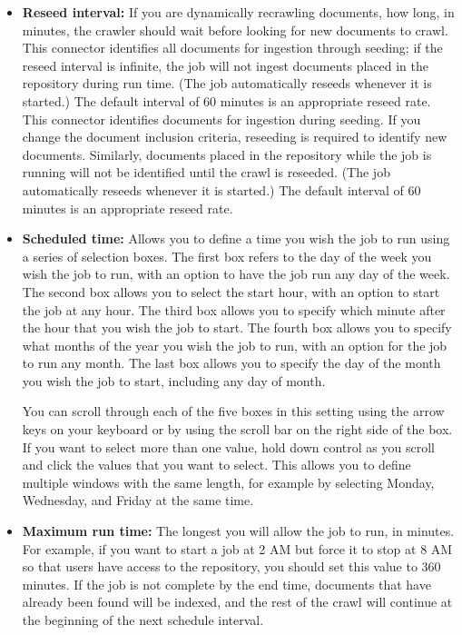 \begin{itemize}
\item \textbf{Reseed interval:} If you are dynamically recrawling
documents, how long, in minutes, the crawler should wait before
looking for new documents to crawl. \ifMeridioGuide This connector
identifies all documents for ingestion through seeding; if the reseed
interval is infinite, the job will not ingest documents placed in the
repository during run time. (The job automatically reseeds whenever it
is started.) The default interval of 60 minutes is an appropriate
reseed rate. \fi \ifFilenetGuide This connector identifies documents
for ingestion during seeding. If you change the document inclusion
criteria, reseeding is required to identify new documents. Similarly,
documents placed in the repository while the job is running will not
be identified until the crawl is reseeded.  (The job automatically
reseeds whenever it is started.) The default interval of 60 minutes is
an appropriate reseed rate. \fi

\item \textbf{Scheduled time:} Allows you to define a time you wish
the job to run using a series of selection boxes. The first box refers
to the day of the week you wish the job to run, with an option to have
the job run any day of the week. The second box allows you to select
the start hour, with an option to start the job at any hour. The third
box allows you to specify which minute after the hour that you wish
the job to start. The fourth box allows you to specify what months of
the year you wish the job to run, with an option for the job to run
any month. The last box allows you to specify the day of the month you
wish the job to start, including any day of month.


You can scroll through each of the five boxes in this setting using
the arrow keys on your keyboard or by using the scroll bar on the
right side of the box.  If you want to select more than one value,
hold down control as you scroll and click the values that you want to
select. This allows you to define multiple windows with the same
length, for example by selecting Monday, Wednesday, and Friday at the
same time.

\item \textbf{Maximum run time:} The longest you will allow the job to
run, in minutes. For example, if you want to start a job at 2 AM but
force it to stop at 8 AM so that users have access to the repository,
you should set this value to 360 minutes. If the job is not complete by the
end time, documents that have already been found will be indexed, and
the rest of the crawl will continue at the beginning of the next
schedule interval. 


\end{itemize}
